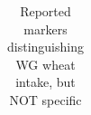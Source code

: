 {\begin{table}[h!]
{\begin{tabular}{|c|c|c|c|c|c|c|}
				\end{tabular}}
		\caption{Reported markers distinguishing WG wheat intake, but NOT specific}
		\label{table:wheat_notspecific}
	\end{table}
}
